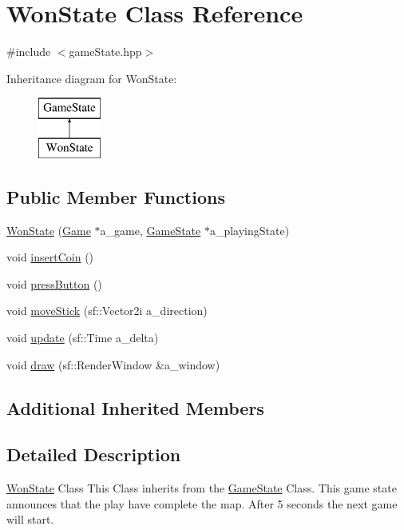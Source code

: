 \hypertarget{class_won_state}{}\section{Won\+State Class Reference}
\label{class_won_state}


{\ttfamily \#include $<$game\+State.\+hpp$>$}

Inheritance diagram for Won\+State\+:\begin{figure}[H]
\begin{center}
\leavevmode
\includegraphics[height=2.000000cm]{class_won_state}
\end{center}
\end{figure}
\subsection*{Public Member Functions}
\begin{DoxyCompactItemize}
\item 
\hyperlink{class_won_state_ac6d2bf732076e157c50066c8c0331f73}{Won\+State} (\hyperlink{class_game}{Game} $\ast$a\+\_\+game, \hyperlink{class_game_state}{Game\+State} $\ast$a\+\_\+playing\+State)
\item 
void \hyperlink{class_won_state_aeaab03fa1a39188c19107047417c65b6}{insert\+Coin} ()
\item 
void \hyperlink{class_won_state_ab17f101d9ab90e60259e28b8775a76ec}{press\+Button} ()
\item 
void \hyperlink{class_won_state_a56b272d25511e6a302136d308648464b}{move\+Stick} (sf\+::\+Vector2i a\+\_\+direction)
\item 
void \hyperlink{class_won_state_a0ea91513e3df2eafbe8ef7b9810eaff1}{update} (sf\+::\+Time a\+\_\+delta)
\item 
void \hyperlink{class_won_state_a88bcef07ae234fe7ba672d1c6628d2c0}{draw} (sf\+::\+Render\+Window \&a\+\_\+window)
\end{DoxyCompactItemize}
\subsection*{Additional Inherited Members}


\subsection{Detailed Description}
\hyperlink{class_won_state}{Won\+State} Class This Class inherits from the \hyperlink{class_game_state}{Game\+State} Class. This game state announces that the play have complete the map. After 5 seconds the next game will start. 

